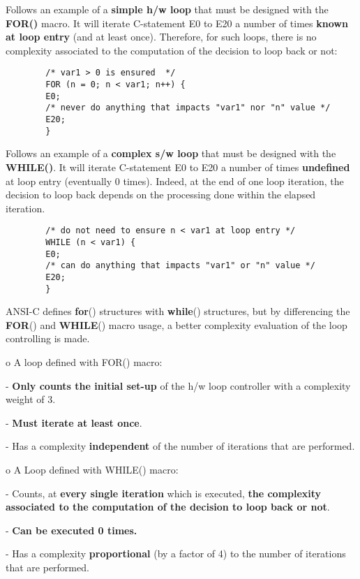 \begin{list}{o}
    \item Follows an example of a \textbf{simple h/w loop} that must
    be designed with the \textbf{FOR()} macro. It will iterate
    C-statement E0 to E20 a number of times \textbf{known at loop
    entry} (and at least once). Therefore, for such loops, there is no
    complexity associated to the computation of the decision to loop
    back or not:
    {\small
    \begin{verbatim}
        /* var1 > 0 is ensured  */
        FOR (n = 0; n < var1; n++) {
        E0;
        /* never do anything that impacts "var1" nor "n" value */
        E20;
        }
    \end{verbatim}}

    \item Follows an example of a \textbf{complex s/w loop} that must be
    designed with the \textbf{WHILE()}. It will iterate C-statement E0 to
    E20 a number of times \textbf{undefined} at loop entry (eventually 0
    times). Indeed, at the end of one loop iteration, the decision to loop
    back depends on the processing done within the elapsed iteration.
    {\small
    \begin{verbatim}
        /* do not need to ensure n < var1 at loop entry */
        WHILE (n < var1) {
        E0;
        /* can do anything that impacts "var1" or "n" value */
        E20;
        }
    \end{verbatim}}
\end{list}

ANSI-C defines \textbf{for}() structures with \textbf{while}()
structures, but by differencing the \textbf{FOR}() and
\textbf{WHILE}() macro usage, a better complexity evaluation of
the loop controlling is made.

\begin{list}{}
    \item o A loop defined with FOR() macro:
    \begin{list}{}
        \item - \textbf{Only counts the initial set-up} of the h/w loop controller with a complexity weight of 3.
        \item - \textbf{Must iterate at least once}.
        \item - Has a complexity \textbf{independent} of the number of iterations that are performed.
    \end{list}
    \item o A Loop defined with WHILE() macro:
    \begin{list}{}
        \item - Counts, at \textbf{every single iteration} which is executed,
        \textbf{the complexity associated to the computation of the
        decision to loop back or not}.
        \item - \textbf{Can be executed 0 times.}
        \item - Has a complexity \textbf{proportional} (by a factor
        of  4) to the number of iterations that are performed.
    \end{list}
\end{list}

